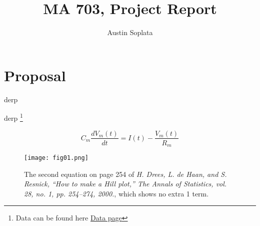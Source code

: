\documentclass[letterpaper,twocolumn]{article}
\begin{document}
\title{MA 703, Project Report}
\author{Austin Soplata}
\maketitle
\pagestyle{fancy} %
\section{Proposal}

\indent\indent derp

derp \footnote{Data can be found here {\color{blue} \href{http://www-personal.umich.edu/~mejn/netdata/}{Data page}} }

\begin{equation}
C_m \frac{d V_m (t)}{dt} = I(t) - \frac{V_m (t)}{R_m}
\end{equation}

\begin{figure}
\centering
\texttt{[image: fig01.png]}
\caption{The second equation on page 254 of {\it H. Drees, L. de Haan, and S. Resnick, “How to make a Hill plot,” The Annals of Statistics, vol. 28, no. 1, pp. 254–274, 2000.}, which shows no extra 1 term.}
\end{figure}






\end{document}
